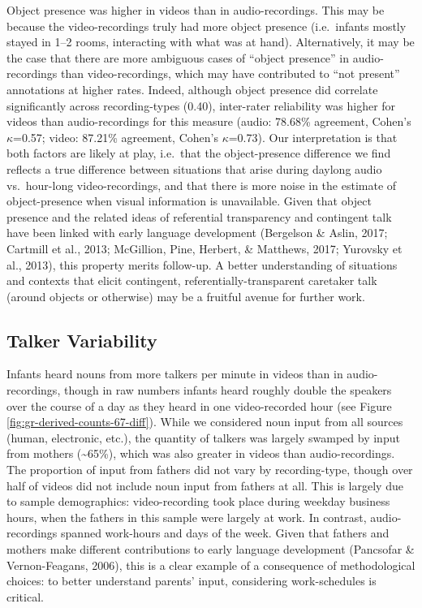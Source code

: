 \documentclass[man]{apa6}
\theoremstyle{definition}
\theoremstyle{definition}
\theoremstyle{definition}
\theoremstyle{remark}
\begin{document}
Object presence was higher in videos than in audio-recordings. This may
be because the video-recordings truly had more object presence
(i.e.~infants mostly stayed in 1--2 rooms, interacting with what was at
hand). Alternatively, it may be the case that there are more ambiguous
cases of \enquote{object presence} in audio-recordings than
video-recordings, which may have contributed to \enquote{not present}
annotations at higher rates. Indeed, although object presence did
correlate significantly across recording-types (0.40), inter-rater
reliability was higher for videos than audio-recordings for this measure
(audio: 78.68\% agreement, Cohen's \(\kappa\)=0.57; video: 87.21\%
agreement, Cohen's \(\kappa\)=0.73). Our interpretation is that both
factors are likely at play, i.e.~that the object-presence difference we
find reflects a true difference between situations that arise during
daylong audio vs.~hour-long video-recordings, and that there is more
noise in the estimate of object-presence when visual information is
unavailable. Given that object presence and the related ideas of
referential transparency and contingent talk have been linked with early
language development (Bergelson \& Aslin, 2017; Cartmill et al., 2013;
McGillion, Pine, Herbert, \& Matthews, 2017; Yurovsky et al., 2013),
this property merits follow-up. A better understanding of situations and
contexts that elicit contingent, referentially-transparent caretaker
talk (around objects or otherwise) may be a fruitful avenue for further
work.

\subsection{Talker Variability}\label{talker-variability}

Infants heard nouns from more talkers per minute in videos than in
audio-recordings, though in raw numbers infants heard roughly double the
speakers over the course of a day as they heard in one video-recorded
hour (see Figure \ref{fig:gr-derived-counts-67-diff}). While we
considered noun input from all sources (human, electronic, etc.), the
quantity of talkers was largely swamped by input from mothers
(\textasciitilde{}65\%), which was also greater in videos than
audio-recordings. The proportion of input from fathers did not vary by
recording-type, though over half of videos did not include noun input
from fathers at all. This is largely due to sample demographics:
video-recording took place during weekday business hours, when the
fathers in this sample were largely at work. In contrast,
audio-recordings spanned work-hours and days of the week. Given that
fathers and mothers make different contributions to early language
development (Pancsofar \& Vernon-Feagans, 2006), this is a clear example
of a consequence of methodological choices: to better understand
parents' input, considering work-schedules is critical.
\end{document}
